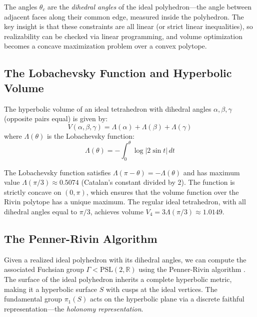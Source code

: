 \documentclass[11pt]{article}
\begin{document}
The angles $\theta_c$ are the \emph{dihedral angles} of the ideal polyhedron---the angle between adjacent faces along their common edge, measured inside the polyhedron. The key insight is that these constraints are all linear (or strict linear inequalities), so realizability can be checked via linear programming, and volume optimization becomes a concave maximization problem over a convex polytope.

\subsection{The Lobachevsky Function and Hyperbolic Volume}

The hyperbolic volume of an ideal tetrahedron with dihedral angles $\alpha, \beta, \gamma$ (opposite pairs equal) is given by:
\[
V(\alpha, \beta, \gamma) = \Lambda(\alpha) + \Lambda(\beta) + \Lambda(\gamma)
\]
where $\Lambda(\theta)$ is the Lobachevsky function:
\[
\Lambda(\theta) = -\int_0^\theta \log |2\sin t| \, dt
\]

The Lobachevsky function satisfies $\Lambda(\pi - \theta) = -\Lambda(\theta)$ and has maximum value $\Lambda(\pi/3) \approx 0.5074$ (Catalan's constant divided by 2). The function is strictly concave on $(0, \pi)$, which ensures that the volume function over the Rivin polytope has a unique maximum. The regular ideal tetrahedron, with all dihedral angles equal to $\pi/3$, achieves volume $V_4 = 3\Lambda(\pi/3) \approx 1.0149$.

\subsection{The Penner-Rivin Algorithm}

Given a realized ideal polyhedron with its dihedral angles, we can compute the associated Fuchsian group $\Gamma < \mathrm{PSL}(2,\mathbb{R})$ using the Penner-Rivin algorithm \cite{RivinTriangulations}. The surface of the ideal polyhedron inherits a complete hyperbolic metric, making it a hyperbolic surface $S$ with cusps at the ideal vertices. The fundamental group $\pi_1(S)$ acts on the hyperbolic plane via a discrete faithful representation---the \emph{holonomy representation}.
\end{document}
